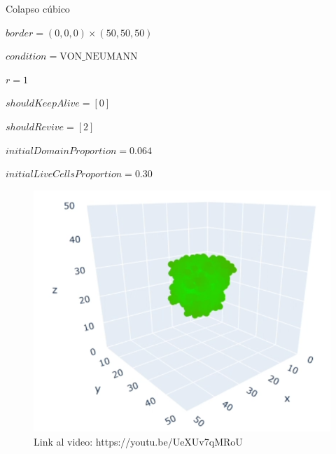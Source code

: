 \begin{frame}{Colapso cúbico}
    \begin{multicols}{2}
        {
            $border = (0, 0, 0) \times (50, 50, 50)$

            $condition = \text{VON}\_\text{NEUMANN}$

            $r = 1$

            $shouldKeepAlive = [0]$

            $shouldRevive = [2]$

            $initialDomainProportion = 0.064$

            $initialLiveCellsProportion = 0.30$
        }

        {\begin{figure}[H]
             \centering
             \includegraphics[width=1\linewidth]{pic/collapse3d/thumbnail_i30}
             \captionsetup{labelformat=empty}
             \caption{Link al video: https://youtu.be/UeXUv7qMRoU}
             \label{fig:colapso3d:thumbnail}
        \end{figure}}
    \end{multicols}
\end{frame}


